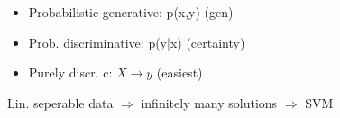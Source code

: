 \begin{itemize}
    \item Probabilistic generative: p(x,y) (gen)
    \item Prob. discriminative: p(y|x) (certainty)
    \item Purely discr. c: $X \rightarrow y$ (easiest)
\end{itemize}

Lin. seperable data $\Rightarrow$ infinitely many solutions $\Rightarrow$ SVM

